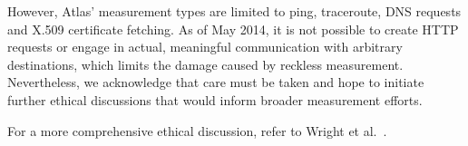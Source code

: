 However, Atlas' measurement types are limited to ping, traceroute, DNS requests
and X.509 certificate fetching.  As of May 2014, it is not possible to create
HTTP requests or engage in actual, meaningful communication with arbitrary
destinations, which limits the damage caused by reckless measurement.
Nevertheless, we acknowledge that care must be taken and hope to initiate
further ethical discussions that would inform broader measurement efforts.

For a more comprehensive ethical discussion, refer to Wright et
al.~\cite[\S~5]{Wright2011}.

